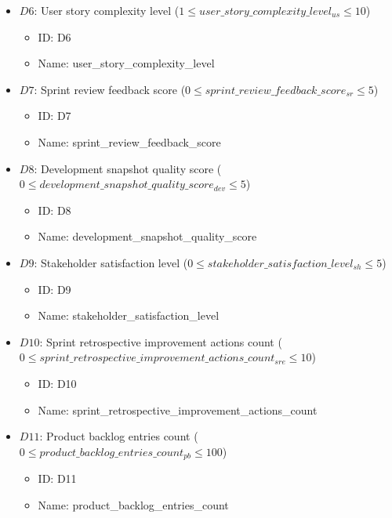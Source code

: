 \documentclass{article}
\begin{document}
\begin{itemize}
\begin{itemize}
        \end{itemize}
    \item $D6$: User story complexity level ($1 \leq user\_story\_complexity\_level_{us} \leq 10$)
        \begin{itemize}
            \item ID: D6
            \item Name: user\_story\_complexity\_level
        \end{itemize}
    \item $D7$: Sprint review feedback score ($0 \leq sprint\_review\_feedback\_score_{sr} \leq 5$)
        \begin{itemize}
            \item ID: D7
            \item Name: sprint\_review\_feedback\_score
        \end{itemize}
    \item $D8$: Development snapshot quality score ($0 \leq development\_snapshot\_quality\_score_{dev} \leq 5$)
        \begin{itemize}
            \item ID: D8
            \item Name: development\_snapshot\_quality\_score
        \end{itemize}
    \item $D9$: Stakeholder satisfaction level ($0 \leq stakeholder\_satisfaction\_level_{sh} \leq 5$)
        \begin{itemize}
            \item ID: D9
            \item Name: stakeholder\_satisfaction\_level
        \end{itemize}
    \item $D10$: Sprint retrospective improvement actions count ($0 \leq sprint\_retrospective\_improvement\_actions\_count_{sre} \leq 10$)
        \begin{itemize}
            \item ID: D10
            \item Name: sprint\_retrospective\_improvement\_actions\_count
        \end{itemize}
    \item $D11$: Product backlog entries count ($0 \leq product\_backlog\_entries\_count_{pb} \leq 100$)
        \begin{itemize}
            \item ID: D11
            \item Name: product\_backlog\_entries\_count

\end{itemize}
\end{itemize}
\end{document}
